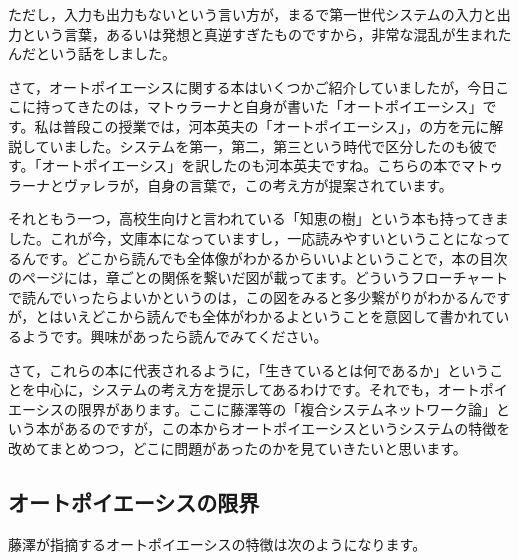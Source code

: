 \documentclass{ltjsbook}
\begin{document}
ただし，入力も出力もないという言い方が，まるで第一世代システムの入力と出力という言葉，あるいは発想と真逆すぎたものですから，非常な混乱が生まれたんだという話をしました。

さて，オートポイエーシスに関する本はいくつかご紹介していましたが，今日ここに持ってきたのは，マトゥラーナと自身が書いた「オートポイエーシス」です\parencite{Maturana_Varela}。私は普段この授業では，河本英夫の「オートポイエーシス」\parencite{KawamotoHideo}，の方を元に解説していました。システムを第一，第二，第三という時代で区分したのも彼です。「オートポイエーシス」\parencite{Maturana_Varela}を訳したのも河本英夫ですね。こちらの本でマトゥラーナとヴァレラが，自身の言葉で，この考え方が提案されています。

それともう一つ，高校生向けと言われている「知恵の樹」という本も持ってきました\parencite{Chienoki}。これが今，文庫本になっていますし，一応読みやすいということになってるんです。どこから読んでも全体像がわかるからいいよということで，本の目次のページには，章ごとの関係を繋いだ図が載ってます。どういうフローチャートで読んでいったらよいかというのは，この図をみると多少繋がりがわかるんですが，とはいえどこから読んでも全体がわかるよということを意図して書かれているようです。興味があったら読んでみてください。

さて，これらの本に代表されるように，「生きているとは何であるか」ということを中心に，システムの考え方を提示してあるわけです。それでも，オートポイエーシスの限界があります。ここに藤澤等の「複合システムネットワーク論」という本があるのですが\parencite{fujisawaNetwork}，この本からオートポイエーシスというシステムの特徴を改めてまとめつつ，どこに問題があったのかを見ていきたいと思います。

\subsection{オートポイエーシスの限界}

藤澤が指摘するオートポイエーシスの特徴は次のようになります。
\end{document}
